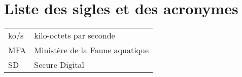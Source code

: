 
%
%


\chapter{Liste des sigles et des acronymes}


\begin{flushleft}
   \begin{tabular}{@{}ll}
		ko/s		& kilo-octets par seconde							\\
		MFA			& Ministère de la Faune aquatique					\\
		SD			& Secure Digital
   \end{tabular}
\end{flushleft}